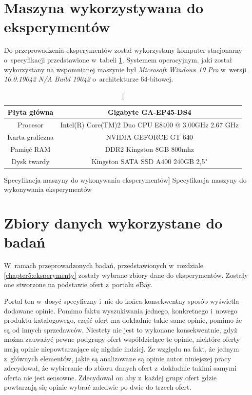 \documentclass[../Kamil_Kowalewski_Main.tex]{subfiles}
\begin{document}
{{    }

    \section{Maszyna wykorzystywana do eksperymentów}
    \label{chapter4:srodowisko_eksperymentalne:maszyna} {
        Do przeprowadzenia eksperymentów został wykorzystany komputer stacjonarny
        o~specyfikacji przedstawione w~tabeli
        \ref{tab:chapter4:srodowisko_eksperymentalne:maszyna:specyfikacja}. Systemem
        operacyjnym, jaki został wykorzystany na wspomnianej maszynie był
        \textit{Microsoft Windows 10 Pro}\cite{website:windows} w~wersji
        \textit{10.0.19042 N/A Build 19042} o~architekturze 64-bitowej.

        \begin{table}[H]
			\footnotesize
            \centering
            \begin{tabular}{|c|c|}
                \hline
                Płyta główna & Gigabyte GA-EP45-DS4 \\ \hline
                Procesor & Intel(R) Core(TM)2 Duo CPU E8400 @ 3.00GHz 2.67 GHz \\ \hline
                Karta graficzna & NVIDIA GEFORCE GT 640 \\ \hline
                Pamięć RAM & DDR2 Kingston 8GB 800mhz \\ \hline
                Dysk twardy & Kingston SATA SSD A400 240GB 2,5" \\ \hline
            \end{tabular}
            \caption
            [Specyfikacja maszyny do wykonywania eksperymentów]
            {Specyfikacja maszyny do wykonywania eksperymentów}
            \label{tab:chapter4:srodowisko_eksperymentalne:maszyna:specyfikacja}
        \end{table}
    }

    \section{Zbiory danych wykorzystane do badań}
    \label{chapter4:srodowisko_eksperymentalne:zbiory_danych} {
        W~ramach przeprowadzonych badań, przedstawionych w~rozdziale
        \ref{chapter5:eksperymenty} zostały wybrane zbiory dane do eksperymentów.
        Zostały one stworzone na podstawie ofert z~portalu eBay\cite{website:ebay}.

        Portal ten w~dosyć specyficzny i~nie do końca konsekwentny sposób wyświetla
        dodawane opinie. Pomimo faktu wyszukiwania jednego, konkretnego i~nowego
        produktu katalogowego, część ofert ma dokładnie takie same opinie, pomimo że są
        od innych sprzedawców. Niestety nie jest to wykonane konsekwentnie, gdyż można
        zauważyć pewne podgrupy ofert współdzielące te opinie, niektóre oferty mają
        opinie niepowtarzające się nigdzie indziej. Ze względu na fakt, że jednym
        z~głównych elementów, jakie są analizowane są opinie autor niniejszej pracy
        zdecydował, że wybieranie do zbioru danych ofert z~dokładnie takimi samymi
        oferta nie jest sensowne. Zdecydował on aby z~każdej grupy ofert gdzie
        powtarzają się opinie wybrać zaledwie po dwie do trzech ofert.

}}
\end{document}
